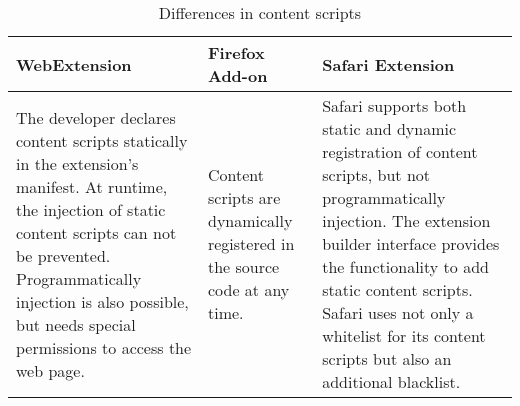 	\begin{table}[h]
		\begin{tabular}{|p{}|p{}|p{}|}\hline
			\textbf{WebExtension} & \textbf{Firefox Add-on} & \textbf{Safari Extension} \\ \hline
			The developer declares content scripts statically in the extension's manifest. At runtime, the injection of static content scripts can not be prevented. Programmatically injection is also possible, but needs special permissions to access the web page. & 
			Content scripts are dynamically registered in the source code at any time. & 
			Safari supports both static and dynamic registration of content scripts, but not programmatically injection. The extension builder interface provides the functionality to add static content scripts. Safari uses not only a whitelist for its content scripts but also an additional blacklist. \\ \hline 
		\end{tabular}
		\caption{Differences in content scripts}
	\end{table}



